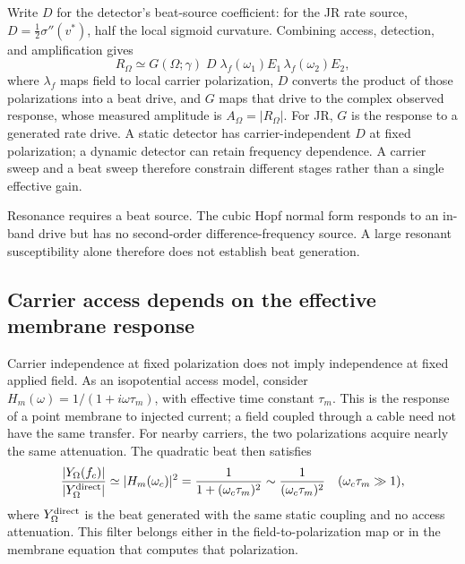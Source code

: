 \documentclass[11pt,a4paper]{article}
\newcommand{\Sig}{\sigma}
\newcommand{\half}{\tfrac{1}{2}}
\begin{document}
Write $D$ for the detector's beat-source coefficient: for the JR rate source,
$D=\half\Sig''(v^*)$, half the local sigmoid curvature. Combining access,
detection, and amplification gives
\begin{equation}
R_\Omega\simeq G(\Omega;\gamma)\;D\;\lambda_f(\omega_1)E_1\,\lambda_f(\omega_2)E_2 ,
\label{eq:receiver}
\end{equation}
\makeatletter\begingroup\edef\@currentlabel{\theequation}\label{eq:spatial}\endgroup\makeatother
where $\lambda_f$ maps field to local carrier polarization, $D$ converts the
product of those polarizations into a beat drive, and $G$ maps that drive to the
complex observed response, whose measured amplitude is $A_\Omega=|R_\Omega|$.
For JR, $G$ is the response to a generated rate drive.
A static detector has carrier-independent $D$ at fixed polarization;
a dynamic detector can retain frequency dependence. A carrier sweep and a beat sweep
therefore constrain different stages rather than a single effective gain.

Resonance requires a beat source. The cubic Hopf normal form
responds to an in-band drive but has no second-order difference-frequency source. A large resonant susceptibility alone therefore does not
establish beat generation.

\subsection{Carrier access depends on the effective membrane response}\label{sec:khz}
Carrier independence at fixed polarization does not imply independence at fixed
applied field. As an isopotential access model, consider
$H_m(\omega)=1/(1+i\omega\tau_m)$, with effective time constant $\tau_m$.
This is the response of a point membrane to injected current; a field coupled
through a cable need not have the same transfer.
For nearby carriers, the two polarizations acquire nearly the same attenuation.
The quadratic beat then satisfies
\begin{equation}
\frac{|Y_\Omega(f_c)|}{|Y_\Omega^{\rm direct}|}
\simeq |H_m(\omega_c)|^2
=\frac{1}{1+(\omega_c\tau_m)^2}
\sim\frac{1}{(\omega_c\tau_m)^2}
\quad(\omega_c\tau_m\gg1),
\label{eq:khz}
\end{equation}
where $Y_\Omega^{\rm direct}$ is the beat generated with the same static coupling
and no access attenuation. This filter belongs either in the field-to-polarization
map or in the membrane equation that computes that polarization.
\end{document}
